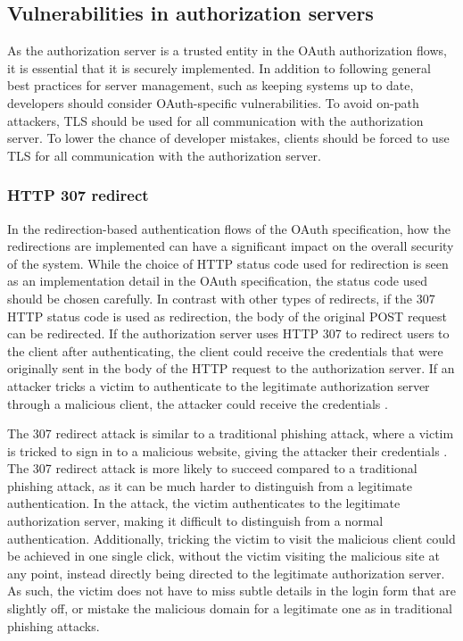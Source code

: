 \subsection{Vulnerabilities in authorization servers}
\label{sec:vulnerabilities-server}
As the authorization server is a trusted entity in the OAuth authorization flows, it is essential that it is securely implemented.
In addition to following general best practices for server management, such as keeping systems up to date, developers should consider OAuth-specific vulnerabilities.
To avoid on-path attackers, TLS should be used for all communication with the authorization server.
To lower the chance of developer mistakes, clients should be forced to use TLS for all communication with the authorization server.

\subsubsection{HTTP 307 redirect}
In the redirection-based authentication flows of the OAuth specification, how the redirections are implemented can have a significant impact on the overall security of the system.
While the choice of HTTP status code used for redirection is seen as an implementation detail in the OAuth specification, the status code used should be chosen carefully.
In contrast with other types of redirects, if the 307 HTTP status code is used as redirection, the body of the original POST request can be redirected.
If the authorization server uses HTTP 307 to redirect users to the client after authenticating, the client could receive the credentials that were originally sent in the body of the HTTP request to the authorization server.
If an attacker tricks a victim to authenticate to the legitimate authorization server through a malicious client, the attacker could receive the credentials  \citep{fett_comprehensive_2016}.

The 307 redirect attack is similar to a traditional phishing attack, where a victim is tricked to sign in to a malicious website, giving the attacker their credentials \citep{dhamija_why_2006}.
The 307 redirect attack is more likely to succeed compared to a traditional phishing attack, as it can be much harder to distinguish from a legitimate authentication.
In the attack, the victim authenticates to the legitimate authorization server, making it difficult to distinguish from a normal authentication.
Additionally, tricking the victim to visit the malicious client could be achieved in one single click, without the victim visiting the malicious site at any point, instead directly being directed to the legitimate authorization server.
As such, the victim does not have to miss subtle details in the login form that are slightly off, or mistake the malicious domain for a legitimate one as in traditional phishing attacks.


